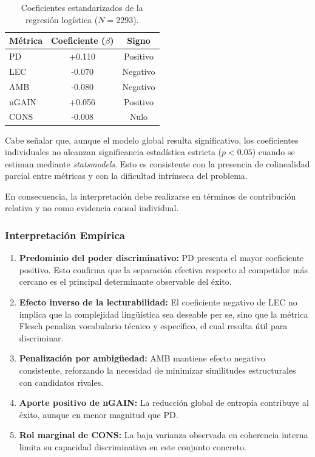 \begin{table}[H]
\centering
\begin{tabular}{|l|c|c|}
\hline
\textbf{Métrica} & \textbf{Coeficiente ($\beta$)} & \textbf{Signo} \\ \hline
PD & +0.110 & Positivo \\
LEC & -0.070 & Negativo \\
AMB & -0.080 & Negativo \\
nGAIN & +0.056 & Positivo \\
CONS & -0.008 & Nulo \\
\hline
\end{tabular}
\caption{Coeficientes estandarizados de la regresión logística ($N=2293$).}
\label{tab:coeficientes_logistica}
\end{table}

Cabe señalar que, aunque el modelo global resulta significativo, los coeficientes individuales no alcanzan significancia estadística estricta ($p<0.05$) cuando se estiman mediante \textit{statsmodels}. Esto es consistente con la presencia de colinealidad parcial entre métricas y con la dificultad intrínseca del problema.

En consecuencia, la interpretación debe realizarse en términos de contribución relativa y no como evidencia causal individual.

\subsubsection{Interpretación Empírica}

\begin{enumerate}

\item \textbf{Predominio del poder discriminativo:} PD presenta el mayor coeficiente positivo. Esto confirma que la separación efectiva respecto al competidor más cercano es el principal determinante observable del éxito.

\item \textbf{Efecto inverso de la lecturabilidad:} El coeficiente negativo de LEC no implica que la complejidad lingüística sea deseable per se, sino que la métrica Flesch penaliza vocabulario técnico y específico, el cual resulta útil para discriminar.

\item \textbf{Penalización por ambigüedad:} AMB mantiene efecto negativo consistente, reforzando la necesidad de minimizar similitudes estructurales con candidatos rivales.

\item \textbf{Aporte positivo de nGAIN:} La reducción global de entropía contribuye al éxito, aunque en menor magnitud que PD.

\item \textbf{Rol marginal de CONS:} La baja varianza observada en coherencia interna limita su capacidad discriminativa en este conjunto concreto.

\end{enumerate}

